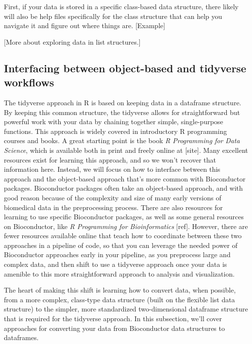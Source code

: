 \documentclass[]{tufte-book}
\begin{document}
First, if your data is stored in a specific class-based data structure, there
likely will also be help files specifically for the class structure that can
help you navigate it and figure out where things are. {[}Example{]}

{[}More about exploring data in list structures.{]}

\hypertarget{interfacing-between-object-based-and-tidyverse-workflows}{%
\subsection{Interfacing between object-based and tidyverse workflows}\label{interfacing-between-object-based-and-tidyverse-workflows}}

The tidyverse approach in R is based on keeping data in a dataframe structure.
By keeping this common structure, the tidyverse allows for straightforward but
powerful work with your data by chaining together simple, single-purpose
functions. This approach is widely covered in introductory R programming courses
and books. A great starting point is the book \emph{R Programming for Data Science},
which is available both in print and freely online at {[}site{]}. Many excellent
resources exist for learning this approach, and so we won't recover that
information here. Instead, we will focus on how to interface between this
approach and the object-based approach that's more common with Bioconductor
packages. Bioconductor packages often take an object-based approach, and with
good reason because of the complexity and size of many early versions of
biomedical data in the preprocessing process. There are also resources for
learning to use specific Bioconductor packages, as well as some general
resources on Bioconductor, like \emph{R Programming for Bioinformatics} {[}ref{]}.
However, there are fewer resources available online that teach how to coordinate
between these two approaches in a pipeline of code, so that you can leverage the
needed power of Bioconductor approaches early in your pipeline, as you
preprocess large and complex data, and then shift to use a tidyverse approach
once your data is amenible to this more straightforward approach to analysis and
visualization.

The heart of making this shift is learning how to convert data, when possible,
from a more complex, class-type data structure (built on the flexible list
data structure) to the simpler, more standardized two-dimensional dataframe
structure that is required for the tidyverse approach. In this subsection, we'll
cover approaches for converting your data from Bioconductor data structures to
dataframes.
\end{document}
